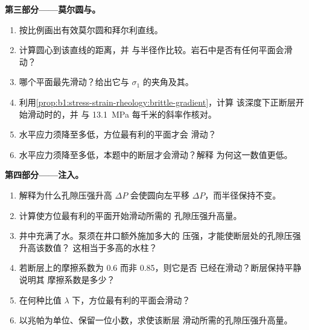 \begin{problem}
\medskip
\noindent\textbf{第三部分——莫尔圆与。}
\begin{enumerate}[resume]
  \item 按比例画出有效莫尔圆和拜尔利直线。
  \item 计算圆心到该直线的距离，并
        与半径作比较。岩石中是否有任何平面会滑动？
  \item 哪个平面最先滑动？给出它与 $\sigma_1$ 的夹角及其。
  \item 利用\cref{prop:b1:stress-strain-rheology:brittle-gradient}，计算
        该深度下正断层开始滑动时的，并
        与 \qty{13.1}{MPa} 每千米的斜率作核对。
  \item 水平应力须降至多低，方位最有利的平面才会
        滑动？
  \item 水平应力须降至多低，本题中的断层才会滑动？解释
        为何这一数值更低。
\end{enumerate}

\medskip
\noindent\textbf{第四部分——注入。}
\begin{enumerate}[resume]
  \item 解释为什么孔隙压强升高 $\Delta P$ 会使圆向左平移 $\Delta P$，而半径保持不变。
  \item 计算使方位最有利的平面开始滑动所需的
        孔隙压强升高量。
  \item 井中充满了水。泵须在井口额外施加多大的
        压强，才能使断层处的孔隙压强升高该数值？
        这相当于多高的水柱？
  \item 若断层上的摩擦系数为 0.6 而非 0.85，则它是否
        已经在滑动？断层保持平静说明其
        摩擦系数是多少？
  \item 在何种比值 $\lambda$ 下，方位最有利的平面会滑动？
  \item 以兆帕为单位、保留一位小数，求使该断层
        滑动所需的孔隙压强升高量。
\end{enumerate}
\end{problem}
